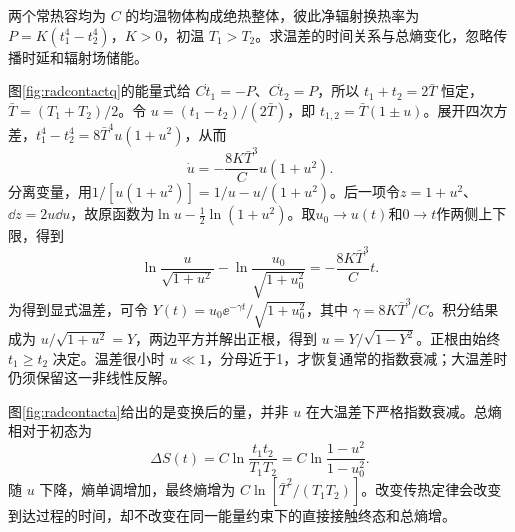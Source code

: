 \begin{example}[有限物体间的辐射换热时间]
两个常热容均为 $C$ 的均温物体构成绝热整体，彼此净辐射换热率为 $P=K(t_1^4-t_2^4)$，$K>0$，初温 $T_1>T_2$。求温差的时间关系与总熵变化，忽略传播时延和辐射场储能。
\end{example}
\begin{solution}
图\ref{fig:radcontactq}的能量式给 $C\dot t_1=-P$、$C\dot t_2=P$，所以 $t_1+t_2=2\bar T$ 恒定，$\bar T=(T_1+T_2)/2$。令 $u=(t_1-t_2)/(2\bar T)$，即 $t_{1,2}=\bar T(1\pm u)$。展开四次方差，$t_1^4-t_2^4=8\bar T^4u(1+u^2)$，从而
\[
 \dot u=-\frac{8K\bar T^3}C u(1+u^2).
\]
分离变量，用$1/[u(1+u^2)]=1/u-u/(1+u^2)$。后一项令$z=1+u^2$、$\dd z=2u\dd u$，故原函数为$\ln u-\tfrac12\ln(1+u^2)$。取$u_0\to u(t)$和$0\to t$作两侧上下限，得到
\[
 \ln\frac{u}{\sqrt{1+u^2}}-
 \ln\frac{u_0}{\sqrt{1+u_0^2}}
 =-\frac{8K\bar T^3}C t.
\]
为得到显式温差，可令 $Y(t)=u_0\ee^{-\gamma t}/\sqrt{1+u_0^2}$，其中 $\gamma=8K\bar T^3/C$。积分结果成为 $u/\sqrt{1+u^2}=Y$，两边平方并解出正根，得到 $u=Y/\sqrt{1-Y^2}$。正根由始终 $t_1\ge t_2$ 决定。温差很小时 $u\ll1$，分母近于1，才恢复通常的指数衰减；大温差时仍须保留这一非线性反解。

图\ref{fig:radcontacta}给出的是变换后的量，并非 $u$ 在大温差下严格指数衰减。总熵相对于初态为
\[
 \Delta S(t)=C\ln\frac{t_1t_2}{T_1T_2}
 =C\ln\frac{1-u^2}{1-u_0^2}.
\]
随 $u$ 下降，熵单调增加，最终熵增为 $C\ln[\bar T^2/(T_1T_2)]$。改变传热定律会改变到达过程的时间，却不改变在同一能量约束下的直接接触终态和总熵增。
\end{solution}
